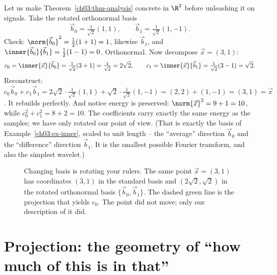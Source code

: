 Let us make Theorem~\ref{ch03:thm-analysis} concrete in $\R^2$ before unleashing it on signals. Take
the rotated orthonormal basis
\[
  \vec{b}_0 = \tfrac{1}{\sqrt2}(1,1), \qquad \vec{b}_1 = \tfrac{1}{\sqrt2}(1,-1).
\]
Check: $\norm{\vec{b}_0}^2 = \tfrac12(1+1)=1$, likewise $\vec{b}_1$, and
$\inner{\vec{b}_0}{\vec{b}_1} = \tfrac12(1-1)=0$. Orthonormal. Now decompose $\vec{x}=(3,1)$:
\[
  c_0 = \inner{\vec{x}}{\vec{b}_0} = \tfrac{1}{\sqrt2}(3+1)=\tfrac{4}{\sqrt2}=2\sqrt2,\qquad
  c_1 = \inner{\vec{x}}{\vec{b}_1} = \tfrac{1}{\sqrt2}(3-1)=\sqrt2 .
\]
Reconstruct: $c_0\vec{b}_0 + c_1\vec{b}_1 = 2\sqrt2\cdot\tfrac{1}{\sqrt2}(1,1) +
\sqrt2\cdot\tfrac{1}{\sqrt2}(1,-1) = (2,2)+(1,-1)=(3,1)=\vec{x}$. It rebuilds perfectly. And notice
energy is preserved: $\norm{\vec{x}}^2 = 9+1 = 10$, while
$c_0^2 + c_1^2 = 8 + 2 = 10$. The coefficients carry exactly the same energy as the samples; we have
only rotated our point of view. (That is exactly the basis of Example~\ref{ch03:ex-inner}, scaled to
unit length -- the ``average'' direction $\vec b_0$ and the ``difference'' direction $\vec b_1$. It
is the smallest possible Fourier transform, and also the simplest wavelet.)

\begin{figure}[H]
\centering
{}
\caption{Changing basis is rotating your rulers. The same point $\vec{x}=(3,1)$ has coordinates
$(3,1)$ in the standard basis and $(2\sqrt2,\sqrt2)$ in the rotated orthonormal basis
$\{\vec{b}_0,\vec{b}_1\}$. The dashed green line is the projection that yields $c_0$. The point did
not move; only our description of it did.}
\label{ch03:fig-basis-change}
\end{figure}

\section{Projection: the geometry of ``how much of this is in that''}
\label{ch03:projection}

